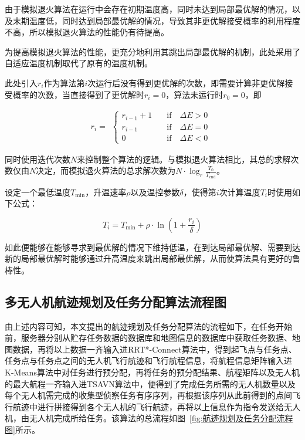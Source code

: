 由于模拟退火算法在运行中会存在初期温度高，同时未达到局部最优解的情况，以及末期温度低，同时达到局部最优解的情况，导致其非更优解接受概率的利用程度不高，所以模拟退火算法的性能仍有待提高。

为提高模拟退火算法的性能，更充分地利用其跳出局部最优解的机制，此处采用了自适应温度机制取代了原有的温度机制。

此处引入\(r_{i}\)作为算法第\(i\)次运行后没有得到更优解的次数，即需要计算非更优解接受概率的次数，当直接得到了更优解时\(r_{i} = 0\)，算法未运行时\(r_{0} = 0\)，即

\begin{equation}
    r_i = 
    \begin{aligned} 
    \begin{cases}
        r_{i-1} + 1 \quad &\text{if} \quad \Delta E > 0\\
        r_{i-1} &\text{if} \quad \Delta E = 0 \\
        0 &\text{if} \quad \Delta E <     0
    \end{cases}
    \end{aligned}
    \nonumber
\end{equation}

同时使用迭代次数\(N\)来控制整个算法的逻辑。与模拟退火算法相比，其总的求解次数仅由\(N\)决定，而模拟退火算法的总求解次数为\(N \cdot \log_{r}\frac{T_{0}}{T_{\text{end}}}\)。

设定一个最低温度\(T_{\min}\)，升温速率\(\rho\)以及温控参数\(\delta\)，使得第\(i\)次计算温度\(T_{i}\)时使用如下公式：

\begin{equation}
    T_i = T_{\min} + \rho \cdot \ln (1 + \frac{r_i}{\delta})
    \nonumber
\end{equation}

如此便能够在能够寻求到最优解的情况下维持低温，在到达局部最优解、需要到达新的局部最优解时能够通过升高温度来跳出局部最优解，从而使算法具有更好的鲁棒性。

\subsection{多无人机航迹规划及任务分配算法流程图}

由上述内容可知，本文提出的航迹规划及任务分配算法的流程如下，在任务开始前，服务器分别从贮存任务数据的数据库和地图信息的数据库中获取任务数据、地图数据，再将以上数据一齐输入进RRT*-Connect算法中，得到起飞点与任务点、任务点与任务点之间的无人机飞行航迹和飞行航程信息，将航程信息矩阵输入进K-Means算法中对任务进行预分配，再将任务的预分配结果、航程矩阵以及无人机的最大航程一齐输入进TSAVN算法中，便得到了完成任务所需的无人机数量以及每个无人机需完成的收集型侦察任务有序序列，再根据该序列从此前得到的点间飞行航迹中进行拼接得到各个无人机的飞行航迹，再将以上信息作为指令发送给无人机，由无人机完成所给任务。该算法的总流程如图~\ref{fig:航迹规划及任务分配流程图}所示。


